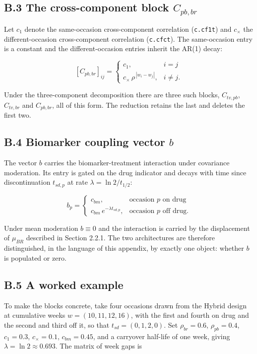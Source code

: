 \documentclass[
  11pt,
]{article}
\begin{document}
\subsection{B.3 The cross-component block $C_{pb,br}$}

Let \(c_1\) denote the same-occasion cross-component correlation
(\texttt{c.cf1t}) and \(c_{\times}\) the different-occasion
cross-component correlation (\texttt{c.cfct}). The same-occasion
entry is a constant and the different-occasion entries inherit the
AR(1) decay:

\[
[C_{pb,br}]_{ij} =
\begin{cases}
c_1, & i = j\\
c_{\times}\,\rho^{\,|w_i - w_j|}, & i \neq j .
\end{cases}
\]

Under the three-component decomposition there are three such blocks,
\(C_{tv,pb}\), \(C_{tv,br}\) and \(C_{pb,br}\), all of this form. The
reduction retains the last and deletes the first two.

\subsection{B.4 Biomarker coupling vector $b$}

The vector \(b\) carries the biomarker-treatment interaction under
covariance moderation. Its entry is gated on the drug indicator and
decays with time since discontinuation \(t_{sd,p}\) at rate \(\lambda =
\ln 2 / t_{1/2}\):

\[
b_p =
\begin{cases}
c_{bm}, & \text{occasion } p \text{ on drug}\\
c_{bm}\,e^{-\lambda t_{sd,p}}, & \text{occasion } p \text{ off drug} .
\end{cases}
\]

Under mean moderation \(b \equiv 0\) and the interaction is carried by
the displacement of \(\mu_{BR}\) described in Section 2.2.1. The two
architectures are therefore distinguished, in the language of this
appendix, by exactly one object: whether \(b\) is populated or zero.

\subsection{B.5 A worked example}

To make the blocks concrete, take four occasions drawn from the
Hybrid design at cumulative weeks \(w = (10, 11, 12, 16)\), with the
first and fourth on drug and the second and third off it, so that
\(t_{sd} = (0, 1, 2, 0)\). Set \(\rho_{br} = 0.6\), \(\rho_{pb} = 0.4\),
\(c_1 = 0.3\), \(c_{\times} = 0.1\), \(c_{bm} = 0.45\), and a carryover
half-life of one week, giving \(\lambda = \ln 2 \approx 0.693\). The
matrix of week gaps is
\end{document}
